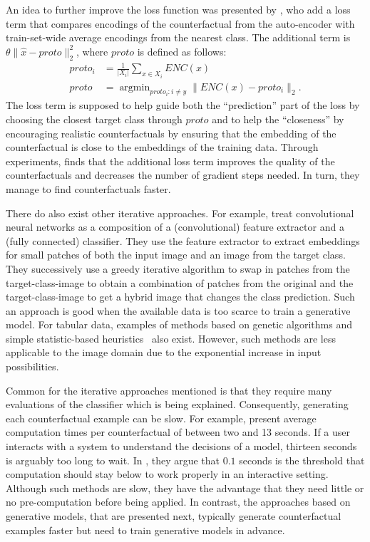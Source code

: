 \documentclass[11pt,a4paper,twoside,openright,final]{memoir}
\DeclareMathOperator*{\argmin}{\arg\min}
\begin{document}
An idea to further improve the loss function was presented by \citet{VanLooveren2019}, who add a loss term that compares encodings of the counterfactual from the auto-encoder with train-set-wide average encodings from the nearest class. 
The additional term is $\theta \| \hat x - proto \|_2^2$, where $proto$ is defined as follows:
\begin{align}\label{eq:prototype}
	proto_i &= \frac{1}{|X_i|}\sum_{x\in X_i} ENC(x)\\
    proto &= \argmin_{proto_i: i \neq y} \| ENC(x) - proto_i\|_2.
\end{align}
The loss term is supposed to help guide both the ``prediction'' part of the loss by choosing the closest target class through $proto$ and to help the ``closeness'' by encouraging realistic counterfactuals by ensuring that the embedding of the counterfactual is close to the embeddings of the training data.
Through experiments, \cite{VanLooveren2019} finds that the additional loss term improves the quality of the counterfactuals and decreases the number of gradient steps needed.
In turn, they manage to find counterfactuals faster. 

There do also exist other iterative approaches.
For example, \citet{goyal19a} treat convolutional neural networks as a composition of a (convolutional) feature extractor and a (fully connected) classifier.
They use the feature extractor to extract embeddings for small patches of both the input image and an image from the target class. 
They successively use a greedy iterative algorithm to swap in patches from the target-class-image to obtain a combination of patches from the original and the target-class-image to get a hybrid image that changes the class prediction.
Such an approach is good when the available data is too scarce to train a generative model. 
For tabular data, examples of methods based on genetic algorithms \cite{Hashemi2020} and simple statistic-based heuristics~\cite{Gomez2020} also exist.
However, such methods are less applicable to the image domain due to the exponential increase in input possibilities. 

Common for the iterative approaches mentioned is that they require many evaluations of the classifier which is being explained.
Consequently, generating each counterfactual example can be slow.
For example, \citet{VanLooveren2019} present average computation times per counterfactual of between two and 13 seconds.
If a user interacts with a system to understand the decisions of a model, thirteen seconds is arguably too long to wait.
In \cite{card1991information}, they argue that $0.1$ seconds is the threshold that computation should stay below to work properly in an interactive setting.
Although such methods are slow, they have the advantage that they need little or no pre-computation before being applied.
In contrast, the approaches based on generative models, that are presented next, typically generate counterfactual examples faster but need to train generative models in advance.%
\end{document}
